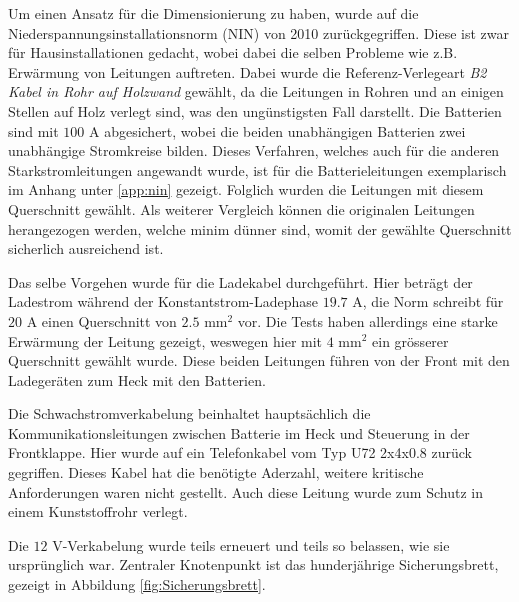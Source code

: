 Um einen Ansatz für die Dimensionierung zu haben, wurde auf die Niederspannungsinstallationsnorm (NIN) von 2010 \cite{NIN} zurückgegriffen. Diese ist zwar für Hausinstallationen gedacht, wobei dabei die selben Probleme wie z.B. Erwärmung von Leitungen auftreten. Dabei wurde die Referenz-Verlegeart \textit{B2 Kabel in Rohr auf Holzwand} gewählt, da die Leitungen in Rohren und an einigen Stellen auf Holz verlegt sind, was den ungünstigsten Fall darstellt. Die Batterien sind mit $100$ A abgesichert, wobei die beiden unabhängigen Batterien zwei unabhängige Stromkreise bilden. Dieses Verfahren, welches auch für die anderen Starkstromleitungen angewandt wurde, ist für die Batterieleitungen exemplarisch im Anhang unter \ref{app:nin} gezeigt. Folglich wurden die Leitungen mit diesem Querschnitt gewählt. Als weiterer Vergleich können die originalen Leitungen herangezogen werden, welche minim dünner sind, womit der gewählte Querschnitt sicherlich ausreichend ist.

Das selbe Vorgehen wurde für die Ladekabel durchgeführt. Hier beträgt der Ladestrom während der Konstantstrom-Ladephase $19.7$ A, die Norm schreibt für $20$ A einen Querschnitt von $2.5$ mm$^2$ vor. Die Tests haben allerdings eine starke Erwärmung der Leitung gezeigt, weswegen hier mit $4$ mm$^2$ ein grösserer Querschnitt gewählt wurde. Diese beiden Leitungen führen von der Front mit den Ladegeräten zum Heck mit den Batterien.

Die Schwachstromverkabelung beinhaltet hauptsächlich die Kommunikationsleitungen zwischen Batterie im Heck und Steuerung in der Frontklappe. Hier wurde auf ein Telefonkabel vom Typ U72 2x4x0.8 \cite{u72} zurück gegriffen. Dieses Kabel hat die benötigte Aderzahl, weitere kritische Anforderungen waren nicht gestellt. Auch diese Leitung wurde zum Schutz in einem Kunststoffrohr verlegt.

Die $12$ V-Verkabelung wurde teils erneuert und teils so belassen, wie sie ursprünglich war. Zentraler Knotenpunkt ist das hunderjährige Sicherungsbrett, gezeigt in Abbildung \ref{fig:Sicherungsbrett}.

